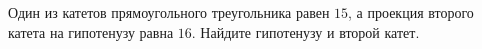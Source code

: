 	\begin{ex}
	\begin{condition}
		Один из катетов прямоугольного треугольника равен \( 15 \), а проекция второго катета на гипотенузу равна \( 16 \). Найдите гипотенузу и второй катет.
	\end{condition}
\end{ex}